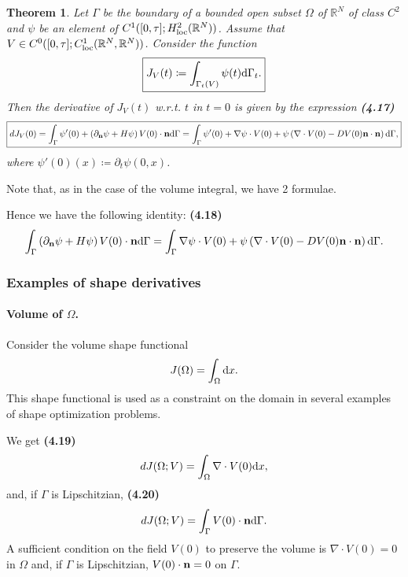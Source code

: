 \documentclass[oneside]{book}
\numberwithin{equation}{section}
\newtheorem{theorem}{Theorem}[section]
\begin{document}
\begin{theorem}
    Let $\Gamma$ be the boundary of a bounded open subset $\Omega$ of $\mathbb{R}^N$ of class $C^2$ and $\psi$ be an element of $C^1([0,\tau];H_{\rm loc}^2(\mathbb{R}^N))$. Assume that $V\in C^0([0,\tau];C_{\rm loc}^1(\mathbb{R}^N,\mathbb{R}^N))$. Consider the function
    \begin{align*}
        \boxed{J_V(t)\coloneqq\int_{\Gamma_t(V)} \psi(t){\rm d}\Gamma_t.}
    \end{align*}
    Then the derivative of $J_V(t)$ w.r.t. $t$ in $t = 0$ is given by the expression \textbf{(4.17)}
    \begin{align*}
        \boxed{dJ_V(0) = \int_\Gamma \psi'(0) + \left(\partial_{\bf n}\psi + H\psi\right)V(0)\cdot{\bf n}{\rm d}\Gamma = \int_\Gamma \psi'(0) + \nabla\psi\cdot V(0) + \psi\left(\nabla\cdot V(0) - DV(0){\bf n}\cdot{\bf n}\right){\rm d}\Gamma,}
    \end{align*}
    where $\psi'(0)(x)\coloneqq\partial_t\psi(0,x)$.
\end{theorem}
Note that, as in the case of the volume integral, we have 2 formulae.

Hence we have the following identity: \textbf{(4.18)}
\begin{align*}
    \int_\Gamma \left(\partial_{\bf n}\psi + H\psi\right)V(0)\cdot{\bf n}{\rm d}\Gamma = \int_\Gamma \nabla\psi\cdot V(0) + \psi\left(\nabla\cdot V(0) - DV(0){\bf n}\cdot{\bf n}\right){\rm d}\Gamma.
\end{align*}

\subsubsection{Examples of shape derivatives}

\paragraph{Volume of $\Omega$.} Consider the volume shape functional
\begin{align*}
    J(\Omega) = \int_\Omega {\rm d}x.
\end{align*}
This shape functional is used as a constraint on the domain in several examples of shape optimization problems.

We get \textbf{(4.19)}
\begin{align*}
    dJ(\Omega;V) = \int_\Omega \nabla\cdot V(0){\rm d}x,
\end{align*}
and, if $\Gamma$ is Lipschitzian, \textbf{(4.20)}
\begin{align*}
    dJ(\Omega;V) = \int_\Gamma V(0)\cdot{\bf n}{\rm d}\Gamma.
\end{align*}
A sufficient condition on the field $V(0)$ to preserve the volume is $\nabla\cdot V(0) = 0$ in $\Omega$ and, if $\Gamma$ is Lipschitzian, $V(0)\cdot{\bf n} = 0$ on $\Gamma$.
\end{document}
